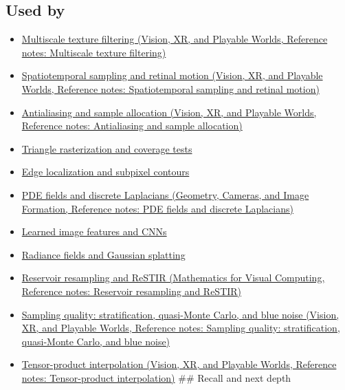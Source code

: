 \subsection{Used by}\label{appendix-6a7869dd79a6-used-by}

\begin{itemize}
\item
  \href{../07-Vision-XR-and-Playable-Worlds/main.pdf\#nameddest=appendix-b677a85ba76f}{Multiscale texture filtering (Vision, XR, and Playable Worlds, Reference notes: Multiscale texture filtering)}
\item
  \href{../07-Vision-XR-and-Playable-Worlds/main.pdf\#nameddest=appendix-70895739febb}{Spatiotemporal sampling and retinal motion (Vision, XR, and Playable Worlds, Reference notes: Spatiotemporal sampling and retinal motion)}
\item
  \href{../07-Vision-XR-and-Playable-Worlds/main.pdf\#nameddest=appendix-4192b2bdd21e}{Antialiasing and sample allocation (Vision, XR, and Playable Worlds, Reference notes: Antialiasing and sample allocation)}
\item
  \hyperref[appendix-ed3f9bc298fe]{Triangle rasterization and coverage tests}
\item
  \hyperref[appendix-36022286b03e]{Edge localization and subpixel contours}
\item
  \href{../03-Geometry-Cameras-and-Image-Formation/main.pdf\#nameddest=appendix-1988d465c119}{PDE fields and discrete Laplacians (Geometry, Cameras, and Image Formation, Reference notes: PDE fields and discrete Laplacians)}
\item
  \hyperref[appendix-47c51ea026fb]{Learned image features and CNNs}
\item
  \hyperref[appendix-c5b332e400e7]{Radiance fields and Gaussian splatting}
\item
  \href{../02-Mathematics-for-Visual-Computing/main.pdf\#nameddest=appendix-68be451b78b1}{Reservoir resampling and ReSTIR (Mathematics for Visual Computing, Reference notes: Reservoir resampling and ReSTIR)}
\item
  \href{../07-Vision-XR-and-Playable-Worlds/main.pdf\#nameddest=appendix-9f693ffd82bc}{Sampling quality: stratification, quasi-Monte Carlo, and blue noise (Vision, XR, and Playable Worlds, Reference notes: Sampling quality: stratification, quasi-Monte Carlo, and blue noise)}
\item
  \href{../07-Vision-XR-and-Playable-Worlds/main.pdf\#nameddest=appendix-0a09b6dfdc86}{Tensor-product interpolation (Vision, XR, and Playable Worlds, Reference notes: Tensor-product interpolation)} \#\# Recall and next depth
\end{itemize}

